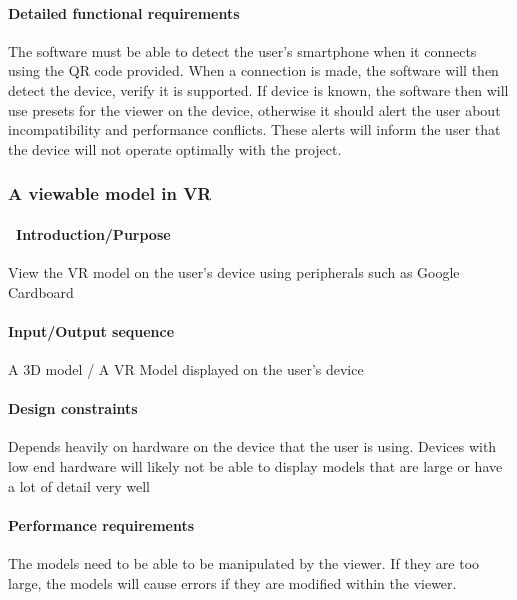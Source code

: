 \documentclass[letterpaper, 10pt, draftclsnofoot, compsoc, onecolumn]{IEEEtran}
\begin{document}
{\paragraph[Detailed functional requirements]{\rmfamily\bfseries\color{black}
Detailed functional requirements }
{\color{black}
The software must be able to detect the user's smartphone when it connects using the QR code provided. When a connection is made, the software will then detect the device, verify it is supported. If device is known, the software then will use presets for the viewer on the device, otherwise it should alert the user about incompatibility and performance conflicts. These alerts will inform the user that the device will not operate optimally with the project. }




\subsubsection[{Google Cardboard}]{\rmfamily\bfseries\color{black} A viewable model in VR }
\paragraph[\ Introduction/Purpose]{\foreignlanguage{english}{\ }\foreignlanguage{english}{Introduction/Purpose
}}
{\color{black}
View the VR model on the user's device using peripherals such as Google Cardboard   }

\paragraph[Input/Output sequence]{\rmfamily\bfseries\color{black}
Input/Output sequence }
{\color{black}
A 3D model / A VR Model displayed on the user's device  }

\paragraph[Design constraints]{\rmfamily\bfseries\color{black} Design
constraints }
{\color{black}
Depends heavily on hardware on the device that the user is using. Devices with low end hardware will likely not be able to display models that are large or have a lot of detail very well  }

\paragraph[Performance requirements]{\rmfamily\bfseries\color{black}
Performance requirements }
{\color{black}
The models need to be able to be manipulated by the viewer. If they are too large, the models will cause errors if they are modified within the viewer.  }

}
\end{document}
